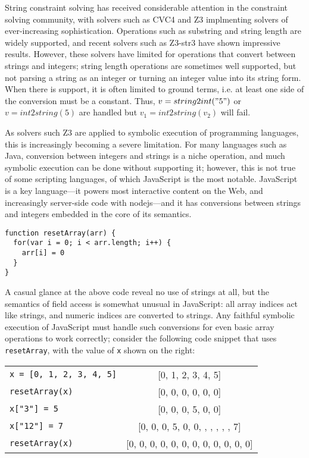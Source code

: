 \documentclass[sigplan,review,anonymous]{acmart}\settopmatter{printfolios=true,printccs=false,printacmref=false}
\begin{document}
String constraint solving has received considerable attention in the constraint solving community, with solvers such as CVC4 and Z3 implmenting solvers of ever-increasing sophistication.  Operations such as substring and string length are widely supported, and recent solvers such as Z3-str3 have shown impressive results.  However, these solvers have limited for operations that convert between strings and integers; string length operations are sometimes well supported, but not parsing a string as an integer or turning an integer value into its string form.  When there is support, it is often limited to ground terms, i.e. at least one side of the conversion must be a constant.  Thus, $v = string2int("5")$ or $v = int2string(5)$ are handled but $v_1 = int2string(v_2)$ will fail.

As solvers such Z3 are applied to symbolic execution of programming languages, this is increasingly becoming a severe limitation.  For many languages such as Java, conversion between integers and strings is a niche operation, and much symbolic execution can be done without supporting it; however, this is not true of some scripting languages, of which JavaScript is the most notable.  JavaScript is a key language---it powers most interactive content on the Web, and increasingly server-side code with nodejs---and it has conversions between strings and integers embedded in the core of its semantics.

\begin{verbatim}
function resetArray(arr) {
  for(var i = 0; i < arr.length; i++) {
    arr[i] = 0
  }
}
\end{verbatim}



A casual glance at the above code reveal no use of strings at all, but the semantics of field access is somewhat unusual in JavaScript: all array indices act like strings, and numeric indices are converted to strings.  Any faithful symbolic execution of JavaScript must handle such conversions for even basic array operations to work correctly; consider the following code snippet that uses {\tt{resetArray}}, with the value of {\tt{x}} shown on the right:

\begin{tabular}{l|c}
	{\tt{x = [0, 1, 2, 3, 4, 5]}} & [0, 1, 2, 3, 4, 5] \\
	{\tt{resetArray(x)}} & [0, 0, 0, 0, 0, 0] \\
	{\tt{x["3"] = 5}} & [0, 0, 0, 5, 0, 0] \\
	{\tt{x["12"] = 7}} & [0, 0, 0, 5, 0, 0, , , , , , 7] \\
	{\tt{resetArray(x)}} & [0, 0, 0, 0, 0, 0, 0, 0, 0, 0, 0, 0] \\
\end{tabular}
\end{document}
